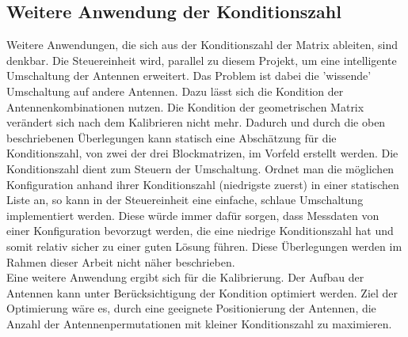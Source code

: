 \subsection{Weitere Anwendung der Konditionszahl}
Weitere Anwendungen, die sich aus der Konditionszahl der Matrix ableiten, sind denkbar. Die Steuereinheit wird, parallel zu diesem Projekt, um eine intelligente Umschaltung der Antennen erweitert. Das Problem ist dabei die 'wissende' Umschaltung auf andere Antennen. Dazu lässt sich die Kondition der Antennenkombinationen nutzen. Die Kondition der geometrischen Matrix verändert sich nach dem Kalibrieren nicht mehr. Dadurch und durch die oben beschriebenen Überlegungen kann statisch eine Abschätzung für die Konditionszahl, von zwei der drei Blockmatrizen, im Vorfeld erstellt werden. Die Konditionszahl dient zum Steuern der Umschaltung. Ordnet man die möglichen Konfiguration anhand ihrer Konditionszahl (niedrigste zuerst) in einer statischen Liste an, so kann in der Steuereinheit eine einfache, schlaue Umschaltung implementiert werden. Diese würde immer dafür sorgen, dass Messdaten von einer Konfiguration bevorzugt werden, die eine niedrige Konditionszahl hat und somit relativ sicher zu einer guten Lösung führen. Diese Überlegungen werden im Rahmen dieser Arbeit nicht näher beschrieben.\\
Eine weitere Anwendung ergibt sich für die Kalibrierung. Der Aufbau der Antennen kann unter Berücksichtigung der Kondition optimiert werden. Ziel der Optimierung wäre es, durch eine geeignete Positionierung der Antennen, die Anzahl der Antennenpermutationen mit kleiner Konditionszahl zu maximieren.